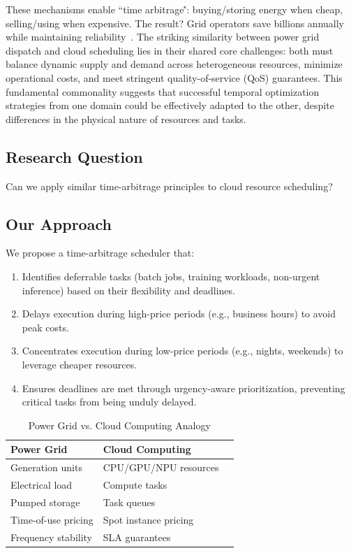 \documentclass[10pt,conference]{IEEEtran}
\begin{document}
These mechanisms enable ``time arbitrage\'': buying/storing energy when cheap, selling/using when expensive. The result? Grid operators save billions annually while maintaining reliability~\cite{denholm2016value}. The striking similarity between power grid dispatch and cloud scheduling lies in their shared core challenges: both must balance dynamic supply and demand across heterogeneous resources, minimize operational costs, and meet stringent quality-of-service (QoS) guarantees. This fundamental commonality suggests that successful temporal optimization strategies from one domain could be effectively adapted to the other, despite differences in the physical nature of resources and tasks.

\subsection{Research Question}

Can we apply similar time-arbitrage principles to cloud resource scheduling?

\subsection{Our Approach}

We propose a time-arbitrage scheduler that:
\begin{enumerate}
    \item Identifies deferrable tasks (batch jobs, training workloads, non-urgent inference) based on their flexibility and deadlines.
    \item Delays execution during high-price periods (e.g., business hours) to avoid peak costs.
    \item Concentrates execution during low-price periods (e.g., nights, weekends) to leverage cheaper resources.
    \item Ensures deadlines are met through urgency-aware prioritization, preventing critical tasks from being unduly delayed.
\end{enumerate}

\begin{table}[t]
\centering
\caption{Power Grid vs. Cloud Computing Analogy}
\label{tab:analogy}
\begin{tabular}{@{}llc@{}}
\toprule
\textbf{Power Grid} & \textbf{Cloud Computing} \\
\midrule
Generation units & CPU/GPU/NPU resources \\
Electrical load & Compute tasks \\
Pumped storage & Task queues \\
Time-of-use pricing & Spot instance pricing \\
Frequency stability & SLA guarantees \\
\bottomrule
\end{tabular}
\end{table}
\end{document}
